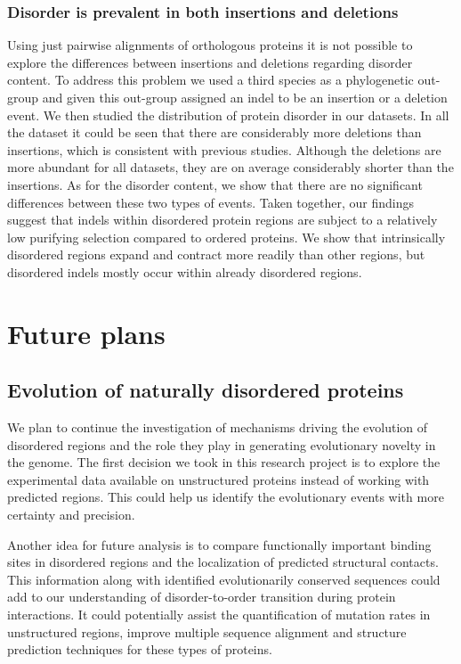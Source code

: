\documentclass[11pt, a4paper,oneside]{report}
\newcommand{\mychapter}[2]{
    \setcounter{chapter}{#1}
    \setcounter{section}{0}
    \chapter*{#2}
    \addcontentsline{toc}{chapter}{#2}
}
\begin{document}
\subsection{Disorder is prevalent in both insertions and deletions}
Using just pairwise alignments of orthologous proteins it is not possible to explore the differences between insertions and deletions regarding disorder content. To address this problem we used a third species as a phylogenetic out-group and given this out-group assigned an indel to be an insertion or a deletion event. We then studied the distribution of protein disorder in our datasets. In all the dataset it could be seen that there are considerably more deletions than insertions, which is consistent with previous studies. Although the deletions are more abundant for all datasets, they are on average considerably shorter than the insertions. As for the disorder content, we show that there are no significant differences between these two types of events. 
Taken together, our findings suggest that indels within disordered protein regions are subject to a relatively low purifying selection compared to ordered proteins. We show that intrinsically disordered regions expand and contract more readily than other regions, but disordered indels mostly occur within already disordered regions. 

\mychapter{4}{Future plans}
\section{Evolution of naturally disordered proteins}
We plan to continue the investigation of mechanisms driving the evolution of disordered regions and the role they play in generating evolutionary novelty in the genome. The first decision we took in this research project is to explore the experimental data available on unstructured proteins instead of working with predicted regions. This could help us identify the evolutionary events with more certainty and precision. 

Another idea for future analysis is to compare functionally important binding sites in disordered regions and the localization of predicted  structural contacts. This information along with identified evolutionarily conserved sequences could add to our understanding of disorder-to-order transition during protein interactions. It could potentially assist the quantification of mutation rates in unstructured regions, improve multiple sequence alignment and structure prediction techniques for these types of proteins.  
\end{document}
